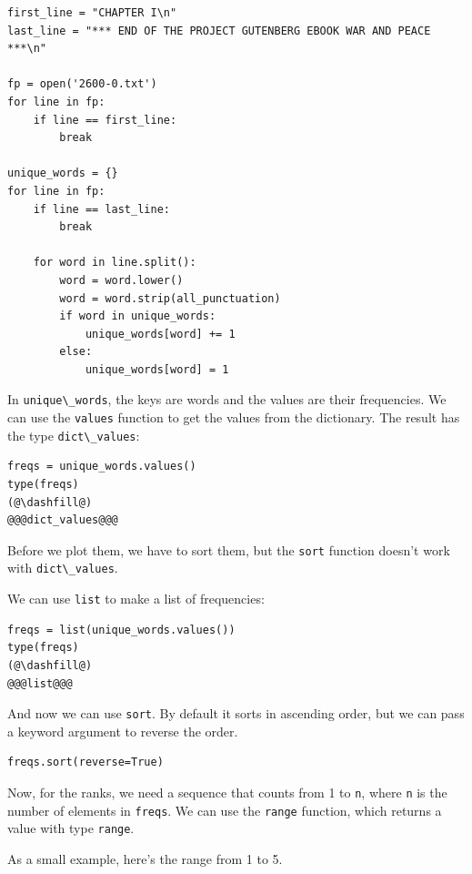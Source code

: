 \begin{lstlisting}[]
first_line = "CHAPTER I\n"
last_line = "*** END OF THE PROJECT GUTENBERG EBOOK WAR AND PEACE ***\n"

fp = open('2600-0.txt')
for line in fp:
    if line == first_line:
        break

unique_words = {}
for line in fp:
    if line == last_line:
        break
        
    for word in line.split():
        word = word.lower()
        word = word.strip(all_punctuation)
        if word in unique_words:
            unique_words[word] += 1
        else:
            unique_words[word] = 1
\end{lstlisting}

In \passthrough{\lstinline!unique\_words!}, the keys are words and the
values are their frequencies. We can use the
\passthrough{\lstinline!values!} function to get the values from the
dictionary. The result has the type
\passthrough{\lstinline!dict\_values!}:

\begin{lstlisting}[]
freqs = unique_words.values()
type(freqs)
(@\dashfill@)
@@@dict_values@@@
\end{lstlisting}

Before we plot them, we have to sort them, but the
\passthrough{\lstinline!sort!} function doesn't work with
\passthrough{\lstinline!dict\_values!}.

We can use \passthrough{\lstinline!list!} to make a list of frequencies:

\begin{lstlisting}[]
freqs = list(unique_words.values())
type(freqs)
(@\dashfill@)
@@@list@@@
\end{lstlisting}

And now we can use \passthrough{\lstinline!sort!}. By default it sorts
in ascending order, but we can pass a keyword argument to reverse the
order.

\begin{lstlisting}[]
freqs.sort(reverse=True)
\end{lstlisting}

Now, for the ranks, we need a sequence that counts from 1 to
\passthrough{\lstinline!n!}, where \passthrough{\lstinline!n!} is the
number of elements in \passthrough{\lstinline!freqs!}. We can use the
\passthrough{\lstinline!range!} function, which returns a value with
type \passthrough{\lstinline!range!}.

As a small example, here's the range from 1 to 5.

